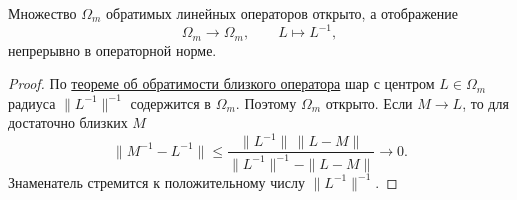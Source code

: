 \label{ticket:08}

\begin{theorem}
Множество $\Omega_m$ обратимых линейных операторов открыто, а отображение
\[
  \Omega_m\to\Omega_m,\qquad L\mapsto L^{-1},
\]
непрерывно в операторной норме.
\end{theorem}

\begin{proof}
По \hyperref[ticket:07]{теореме об обратимости близкого оператора} шар с центром $L\in\Omega_m$ радиуса $\|L^{-1}\|^{-1}$ содержится в $\Omega_m$.
Поэтому $\Omega_m$ открыто.
Если $M\to L$, то для достаточно близких $M$
\[
  \|M^{-1}-L^{-1}\|
  \le\frac{\|L^{-1}\|\,\|L-M\|}{\|L^{-1}\|^{-1}-\|L-M\|}\longrightarrow0.
\]
Знаменатель стремится к положительному числу $\|L^{-1}\|^{-1}$.
\end{proof}
